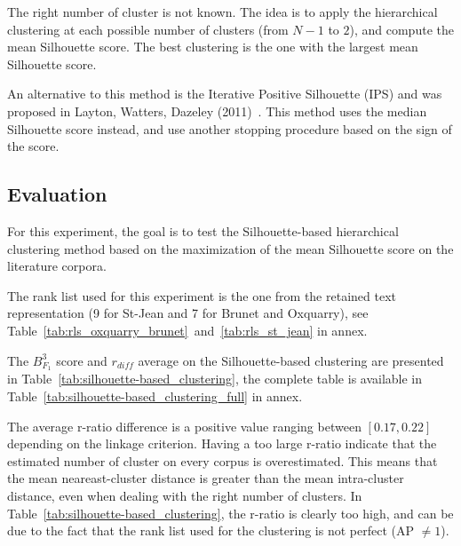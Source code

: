 The right number of cluster is not known.
The idea is to apply the hierarchical clustering at each possible number of clusters (from $N - 1$ to $2$), and compute the mean Silhouette score.
The best clustering is the one with the largest mean Silhouette score.

An alternative to this method is the Iterative Positive Silhouette (IPS) and was proposed in Layton, Watters, Dazeley (2011)~\cite{automated_unsupervised}.
This method uses the median Silhouette score instead, and use another stopping procedure based on the sign of the score.

\subsection{Evaluation}

For this experiment, the goal is to test the Silhouette-based hierarchical clustering method based on the maximization of the mean Silhouette score on the literature corpora.

The rank list used for this experiment is the one from the retained text representation (9 for St-Jean and 7 for Brunet and Oxquarry), see Table~\ref{tab:rls_oxquarry_brunet}~and~\ref{tab:rls_st_jean} in annex.

The $B^3_{F_1}$ score and $r_{diff}$ average on the Silhouette-based clustering are presented in Table~\ref{tab:silhouette-based_clustering}, the complete table is available in Table~\ref{tab:silhouette-based_clustering_full} in annex.

The average r-ratio difference is a positive value ranging between $\left[0.17, 0.22\right]$ depending on the linkage criterion.
Having a too large r-ratio indicate that the estimated number of cluster on every corpus is overestimated.
This means that the mean neareast-cluster distance is greater than the mean intra-cluster distance, even when dealing with the right number of clusters.
In Table~\ref{tab:silhouette-based_clustering}, the r-ratio is clearly too high, and can be due to the fact that the rank list used for the clustering is not perfect (AP $\neq 1$).

